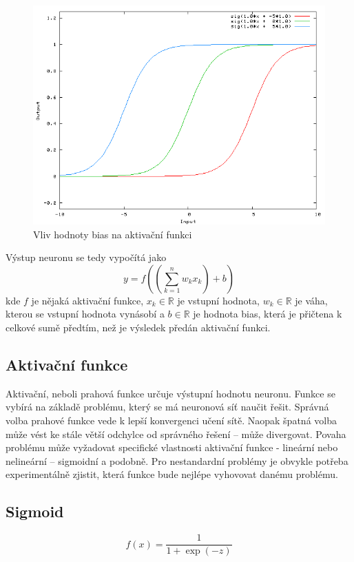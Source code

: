 \begin{figure}[H]
    \centering
    \includegraphics[scale=0.4]{obrazky-figures/bias.png}
    \caption{\label{fig:bias}Vliv hodnoty bias na aktivační funkci}
\end{figure}

Výstup neuronu se tedy vypočítá jako
\begin{equation}
y = f((\sum_{k=1}^n w_kx_k) + b)
\end{equation}
kde $f$ je nějaká aktivační funkce, $x_k \in \mathbb{R}$ je vstupní hodnota, $w_k \in \mathbb{R}$ je váha, kterou se vstupní hodnota vynásobí a $b \in \mathbb{R}$ je hodnota bias, která je přičtena k celkové sumě předtím, než je výsledek předán aktivační funkci.

\subsection{Aktivační funkce}
Aktivační, neboli prahová funkce určuje výstupní hodnotu neuronu. Funkce se vybírá na základě problému, který se má neuronová síť naučit řešit. Správná volba prahové funkce vede k lepší konvergenci učení sítě. Naopak špatná volba může vést ke stále větší odchylce od správného řešení -- může divergovat. Povaha problému může vyžadovat specifické vlastnosti aktivační funkce - lineární nebo nelineární -- sigmoidní a podobně. Pro nestandardní problémy je obvykle potřeba experimentálně zjistit, která funkce bude nejlépe vyhovovat danému problému. 

\subsection*{Sigmoid}
\begin{equation}
  f(x) = \frac{1}{1+\exp(-z)}
\end{equation}

